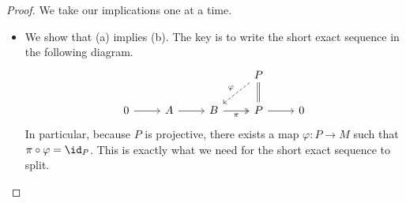 \begin{proof}
	We take our implications one at a time.
	\begin{itemize}
		\item We show that (a) implies (b). The key is to write the short exact sequence in the following diagram.
		\[\begin{tikzcd}
			&&& P \\
			0 & A & B & P & 0
			\arrow[Rightarrow, no head, from=1-4, to=2-4]
			\arrow["\varphi"', dashed, from=1-4, to=2-3]
			\arrow["\pi"', two heads, from=2-3, to=2-4]
			\arrow[from=2-1, to=2-2]
			\arrow[from=2-2, to=2-3]
			\arrow[from=2-4, to=2-5]
		\end{tikzcd}\]
		In particular, because $P$ is projective, there exists a map $\varphi:P\to M$ such that $\pi\circ\varphi=\id_P$. This is exactly what we need for the short exact sequence to split.


\end{itemize}
\end{proof}
